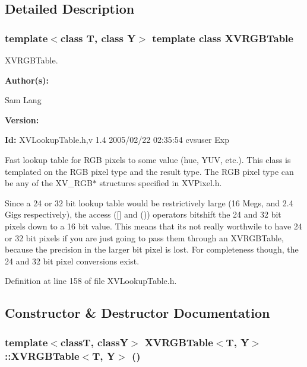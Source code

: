 \subsection{Detailed Description}
\subsubsection*{template$<$class T, class Y$>$  template class XVRGBTable}

XVRGBTable.

\begin{Desc}
\item[{\bf Author(s): }]\par
 Sam Lang \end{Desc}
\begin{Desc}
\item[{\bf Version: }]\par
 \end{Desc}
\begin{Desc}
\item[{\bf Id: }] XVLookup\-Table.h,v 1.4 2005/02/22 02:35:54 cvsuser Exp \end{Desc}


Fast lookup table for RGB pixels to some value (hue, YUV, etc.). This class is templated on the RGB pixel type and the result type. The RGB pixel type can be any of the XV\_\-RGB$\ast$ structures specified in XVPixel.h.

Since a 24 or 32 bit lookup table would be restrictively large (16 Megs, and 2.4 Gigs respectively), the access (\mbox{[}\mbox{]} and ()) operators bitshift the 24 and 32 bit pixels down to a 16 bit value. This means that its not really worthwile to have 24 or 32 bit pixels if you are just going to pass them through an XVRGBTable, because the precision in the larger bit pixel is lost. For completeness though, the 24 and 32 bit pixel conversions exist. 



Definition at line 158 of file XVLookup\-Table.h.

\subsection{Constructor \& Destructor Documentation}
\label{XVRGBTable_a0}
\hypertarget{class_XVRGBTable_a0}{
\subsubsection[XVRGBTable]{\setlength{\rightskip}{0pt plus 5cm}template$<$classT, classY$>$ XVRGBTable$<$T, Y$>$::XVRGBTable$<$T, Y$>$ ()}}




